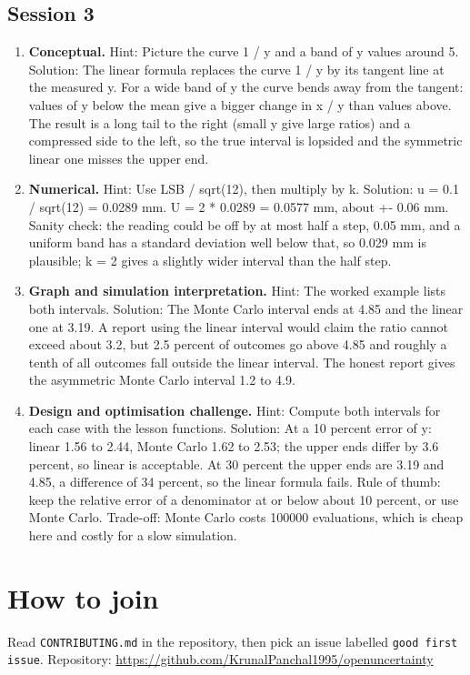 \documentclass[11pt,a4paper]{article}
\begin{document}
\subsection*{Session 3}
\begin{enumerate}[nosep]
\item \textbf{Conceptual.} Hint: Picture the curve 1 / y and a band of y values around 5. Solution: The linear formula replaces the curve 1 / y by its tangent line at the measured y. For a wide band of y the curve bends away from the tangent: values of y below the mean give a bigger change in x / y than values above. The result is a long tail to the right (small y give large ratios) and a compressed side to the left, so the true interval is lopsided and the symmetric linear one misses the upper end.
\item \textbf{Numerical.} Hint: Use LSB / sqrt(12), then multiply by k. Solution: u = 0.1 / sqrt(12) = 0.0289 mm. U = 2 * 0.0289 = 0.0577 mm, about +- 0.06 mm. Sanity check: the reading could be off by at most half a step, 0.05 mm, and a uniform band has a standard deviation well below that, so 0.029 mm is plausible; k = 2 gives a slightly wider interval than the half step.
\item \textbf{Graph and simulation interpretation.} Hint: The worked example lists both intervals. Solution: The Monte Carlo interval ends at 4.85 and the linear one at 3.19. A report using the linear interval would claim the ratio cannot exceed about 3.2, but 2.5 percent of outcomes go above 4.85 and roughly a tenth of all outcomes fall outside the linear interval. The honest report gives the asymmetric Monte Carlo interval 1.2 to 4.9.
\item \textbf{Design and optimisation challenge.} Hint: Compute both intervals for each case with the lesson functions. Solution: At a 10 percent error of y: linear 1.56 to 2.44, Monte Carlo 1.62 to 2.53; the upper ends differ by 3.6 percent, so linear is acceptable. At 30 percent the upper ends are 3.19 and 4.85, a difference of 34 percent, so the linear formula fails. Rule of thumb: keep the relative error of a denominator at or below about 10 percent, or use Monte Carlo. Trade-off: Monte Carlo costs 100000 evaluations, which is cheap here and costly for a slow simulation.
\end{enumerate}

\section{How to join}
Read \texttt{CONTRIBUTING.md} in the repository, then pick an issue labelled \texttt{good first issue}. Repository: \url{https://github.com/KrunalPanchal1995/openuncertainty}
\end{document}
